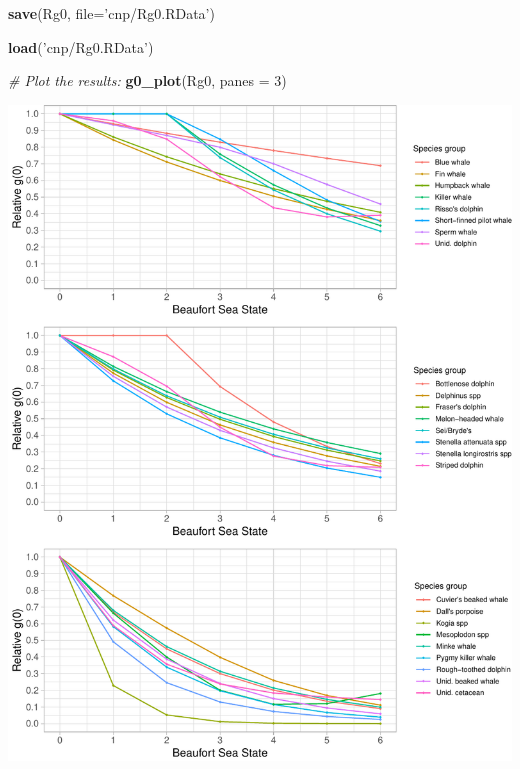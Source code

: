 \documentclass[
]{book}
\newenvironment{Shaded}{\begin{snugshade}}{\end{snugshade}}
\newcommand{\CommentTok}[1]{\textcolor[rgb]{0.56,0.35,0.01}{\textit{#1}}}
\newcommand{\DataTypeTok}[1]{\textcolor[rgb]{0.13,0.29,0.53}{#1}}
\newcommand{\DecValTok}[1]{\textcolor[rgb]{0.00,0.00,0.81}{#1}}
\newcommand{\KeywordTok}[1]{\textcolor[rgb]{0.13,0.29,0.53}{\textbf{#1}}}
\newcommand{\NormalTok}[1]{#1}
\newcommand{\StringTok}[1]{\textcolor[rgb]{0.31,0.60,0.02}{#1}}
\begin{document}
\begin{Shaded}
\begin{Highlighting}[]
\KeywordTok{save}\NormalTok{(Rg0, }\DataTypeTok{file=}\StringTok{'cnp/Rg0.RData'}\NormalTok{)}
\end{Highlighting}
\end{Shaded}

\begin{Shaded}
\begin{Highlighting}[]
\KeywordTok{load}\NormalTok{(}\StringTok{'cnp/Rg0.RData'}\NormalTok{)}
\end{Highlighting}
\end{Shaded}

\begin{Shaded}
\begin{Highlighting}[]
\CommentTok{# Plot the results: }
\KeywordTok{g0_plot}\NormalTok{(Rg0, }\DataTypeTok{panes =} \DecValTok{3}\NormalTok{)}
\end{Highlighting}
\end{Shaded}

\includegraphics{figures/unnamed-chunk-328-1.pdf}
\end{document}
